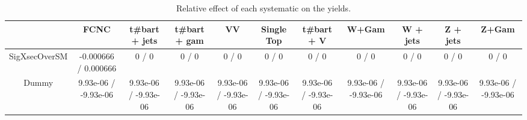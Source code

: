 \begin{table}[htbp]
\begin{center}
\footnotesize
\begin{tabular}{|c|c|c|c|c|c|c|c|c|c|c|}
\hline 
      & FCNC      & t#bar{t} + jets      & t#bar{t} +  gam      & VV      & Single Top      & t#bar{t} + V      & W+Gam      & W + jets      & Z + jets      & Z+Gam \\ 
\hline 
 SigXsecOverSM & -0.000666 / 0.000666 & 0 / 0 & 0 / 0 & 0 / 0 & 0 / 0 & 0 / 0 & 0 / 0 & 0 / 0 & 0 / 0 & 0 / 0 \\ 
  Dummy & 9.93e-06 / -9.93e-06 & 9.93e-06 / -9.93e-06 & 9.93e-06 / -9.93e-06 & 9.93e-06 / -9.93e-06 & 9.93e-06 / -9.93e-06 & 9.93e-06 / -9.93e-06 & 9.93e-06 / -9.93e-06 & 9.93e-06 / -9.93e-06 & 9.93e-06 / -9.93e-06 & 9.93e-06 / -9.93e-06 \\ 
\hline 
\end{tabular} 
\caption{Relative effect of each systematic on the yields.} 
\end{center} 
\end{table} 
